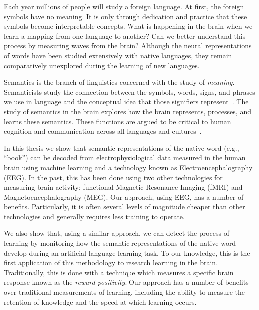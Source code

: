 \label{chapter:introduction}

Each year millions of people will study a foreign language. At first, the 
foreign symbols have no meaning. It is only through dedication and practice 
that these symbols become interpretable concepts. What is happening in the 
brain when we learn a mapping from one language to another? Can we better 
understand this process by measuring waves from the brain? Although the neural 
representations of words have been studied extensively with native languages,
they remain comparatively unexplored during the learning of new languages.
 
Semantics is the branch of linguistics concerned with the study of 
\emph{meaning}. Semanticists study the connection between the symbols, words, 
signs, and phrases we use in language and the conceptual idea that those 
signifiers represent~\cite{kreidler2002introducing}. The study of semantics in 
the brain explores how the brain represents, processes, and learns these 
semantics. These functions are argued to be critical to human cognition and 
communication across all languages and cultures~\cite{croft2004cognitive}.

In this thesis we show that semantic representations of the native word (e.g.,
``book'') can be decoded from electrophysiological data measured in the human 
brain using machine learning and a technology known as Electroencephalography 
(EEG).  In the past, this has been done using two other technologies for 
measuring brain activity: functional Magnetic Resonance Imaging (fMRI) and 
Magnetoencephalography (MEG).  Our approach, using EEG, has a number of 
benefits. Particularly, it is often several levels of magnitude cheaper than 
other technologies and generally requires less training to operate.

We also show that, using a similar approach, we can detect the process of 
learning by monitoring how the semantic representations of the native word 
develop during an artificial language learning task. To our knowledge, this is 
the first application of this methodology to research learning in the brain.  
Traditionally, this is done with a technique which measures a specific brain 
response known as the \emph{reward positivity}. Our approach has a number of 
benefits over traditional measurements of learning, including the ability to 
measure the retention of knowledge and the speed at which learning occurs.






